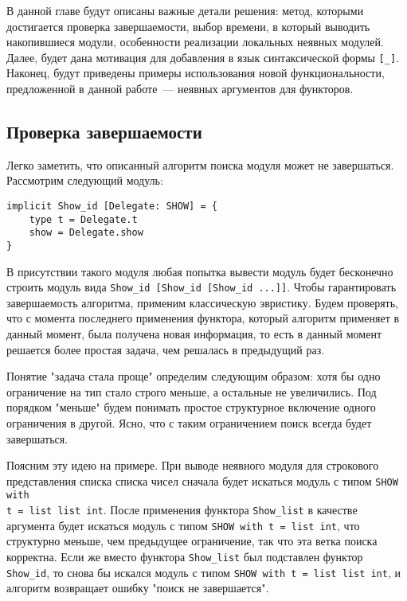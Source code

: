 \documentclass[../diploma.tex]{subfiles}
\begin{document}
\label{sec:2}

В данной главе будут описаны важные детали решения: метод, которыми достигается проверка завершаемости, выбор времени, в который выводить накопившиеся модули, особенности реализации локальных неявных модулей. Далее, будет дана мотивация для добавления в язык синтаксической формы \texttt{[_]}. Наконец, будут приведены примеры использования новой функциональности, предложенной в данной работе~--- неявных аргументов для функторов.

\subsection{Проверка завершаемости}\label{termination}

Легко заметить, что описанный алгоритм поиска модуля может не завершаться. Рассмотрим следующий модуль:

\begin{verbatim}
implicit Show_id [Delegate: SHOW] = {
    type t = Delegate.t
    show = Delegate.show
}
\end{verbatim}

В присутствии такого модуля любая попытка вывести модуль будет бесконечно строить модуль вида \texttt{Show_id [Show_id [Show_id ...]]}. Чтобы гарантировать завершаемость алгоритма, применим классическую эвристику. Будем проверять, что с момента последнего применения функтора, который алгоритм применяет в данный момент, была получена новая информация, то есть в данный момент решается более простая задача, чем решалась в предыдущий раз.

Понятие "задача стала проще" определим следующим образом: хотя бы одно ограничение на тип стало строго меньше, а остальные не увеличились. Под порядком "меньше" будем понимать простое структурное включение одного ограничения в другой. Ясно, что с таким ограничением поиск всегда будет завершаться.

Поясним эту идею на примере. При выводе неявного модуля для строкового представления списка списка чисел сначала будет искаться модуль с типом \texttt{SHOW with}\\\texttt{t = list list int}. После применения функтора \texttt{Show_list} в качестве аргумента будет искаться модуль с типом \texttt{SHOW with t = list int}, что структурно меньше, чем предыдущее ограничение, так что эта ветка поиска корректна. Если же вместо функтора \texttt{Show_list} был подставлен функтор \texttt{Show_id}, то снова бы искался модуль с типом \texttt{SHOW with t = list list int}, и алгоритм возвращает ошибку "поиск не завершается".
\end{document}
